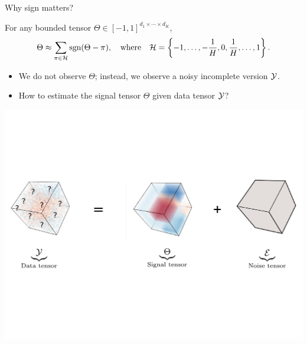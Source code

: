 \documentclass[10pt, mathserif]{beamer} %
\theoremstyle{definition}
\theoremstyle{plain}
\def\sign{\textup{sgn}}
\begin{document}
\begin{frame}{Why sign matters?}

For any bounded tensor $\Theta\in[-1,1]^{d_1\times \cdots \times d_K}$, 
\[
\Theta \approx \sum_{\pi \in \tH} \sign(\Theta-\pi), \quad \text{where}\quad \tH=\left\{-1,\ldots,-{1\over H}, 0, {1\over H}, \ldots, 1\right\}. 
\]


    \begin{itemize}
        \item We do not observe $\Theta$; instead, we observe a noisy incomplete version $\mathcal{Y}$. 
           \item How to estimate the signal tensor $\Theta$ given data tensor $\mathcal{Y}$?
    \end{itemize}
         \begin{center}
    \includegraphics[width =\textwidth]{Figures/signalnoise.pdf}
    \end{center}
  
\end{frame}
\end{document}
